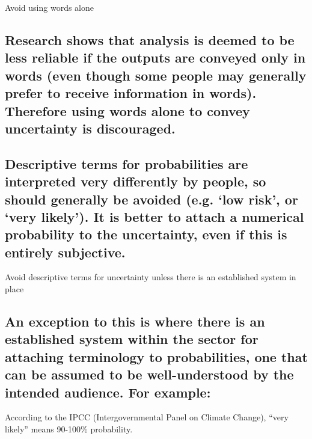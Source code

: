 \documentclass[]{book}
\begin{document}
 Avoid using words alone

\subsection{Research shows that analysis is deemed to be less reliable
if the outputs are conveyed only in words (even though some people may
generally prefer to receive information in words). Therefore using words
alone to convey uncertainty is
discouraged.}\label{research-shows-that-analysis-is-deemed-to-be-less-reliable-if-the-outputs-are-conveyed-only-in-words-even-though-some-people-may-generally-prefer-to-receive-information-in-words.-therefore-using-words-alone-to-convey-uncertainty-is-discouraged.}

\subsection{\texorpdfstring{Descriptive terms for probabilities are
interpreted very differently by people, so should generally be avoided
(e.g. `low risk', or `very likely'). It is better to attach a numerical
probability to the uncertainty, even if this is entirely
subjective.}{Descriptive terms for probabilities are interpreted very differently by people, so should generally be avoided (e.g. low risk, or very likely). It is better to attach a numerical probability to the uncertainty, even if this is entirely subjective.}}\label{descriptive-terms-for-probabilities-are-interpreted-very-differently-by-people-so-should-generally-be-avoided-e.g.-low-risk-or-very-likely.-it-is-better-to-attach-a-numerical-probability-to-the-uncertainty-even-if-this-is-entirely-subjective.}

 Avoid descriptive terms for uncertainty unless there is an established
system in place

\subsection{An exception to this is where there is an established system
within the sector for attaching terminology to probabilities, one that
can be assumed to be well-understood by the intended audience. For
example:}\label{an-exception-to-this-is-where-there-is-an-established-system-within-the-sector-for-attaching-terminology-to-probabilities-one-that-can-be-assumed-to-be-well-understood-by-the-intended-audience.-for-example}

According to the IPCC (Intergovernmental Panel on Climate Change),
``very likely'' means 90-100\% probability.
\end{document}
